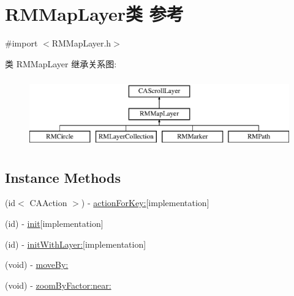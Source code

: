 \hypertarget{interface_r_m_map_layer}{\section{R\-M\-Map\-Layer类 参考}
\label{interface_r_m_map_layer}
}


{\ttfamily \#import $<$R\-M\-Map\-Layer.\-h$>$}

类 R\-M\-Map\-Layer 继承关系图\-:\begin{figure}[H]
\begin{center}
\leavevmode
\includegraphics[height=3.000000cm]{interface_r_m_map_layer}
\end{center}
\end{figure}
\subsection*{Instance Methods}
\begin{DoxyCompactItemize}
\item 
(id$<$ C\-A\-Action $>$) -\/ \hyperlink{interface_r_m_map_layer_a28e0dabc0cf8638c6d26358354f4fcf8}{action\-For\-Key\-:}{\ttfamily  \mbox{[}implementation\mbox{]}}
\item 
(id) -\/ \hyperlink{interface_r_m_map_layer_a0ef1b877235bcaedb2929dae3bd92750}{init}{\ttfamily  \mbox{[}implementation\mbox{]}}
\item 
(id) -\/ \hyperlink{interface_r_m_map_layer_aa32c5f5b5e5d2723763780b9ccbabce8}{init\-With\-Layer\-:}{\ttfamily  \mbox{[}implementation\mbox{]}}
\item 
(void) -\/ \hyperlink{interface_r_m_map_layer_ac960944a80c596eb918531cf63c54c11}{move\-By\-:}
\item 
(void) -\/ \hyperlink{interface_r_m_map_layer_ae0e1f8c364aaca4ac39766fe14bbba07}{zoom\-By\-Factor\-:near\-:}
\end{DoxyCompactItemize}


